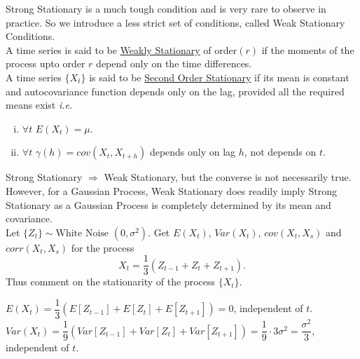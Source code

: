 \documentclass[11pt, a4paper]{article}
\numberwithin{equation}{section}
\theoremstyle{definition}
\begin{document}
Strong Stationary is a much tough condition and is very rare to observe in practice. So we introduce a less strict set of conditions, called Weak Stationary Conditions. \\

A time series is said to be \underline{Weakly Stationary} of order$(r)$ if the moments of the process upto order $r$ depend only on the time differences. \\

A time series $\{X_t\}$ is said to be \underline{Second Order Stationary} if its mean is constant and autocovariance function depends only on the lag, provided all the required means exist \textit{i.e.}

\begin{enumerate}[(i)]
\item $\forall t$ $E(X_t) = \mu$.
\item $\forall t$ $\gamma(h) = cov(X_t, X_{t+h})$ depends only on lag $h$, not depends on $t$.
\end{enumerate}

\bcattention \hspace{0.1cm} Strong Stationary $\Rightarrow$ Weak Stationary, but the converse is not necessarily true. However, for a Gaussian Process, Weak Stationary does readily imply Strong Stationary as a Gaussian Process is completely determined by its mean and covariance. \\

\bcquestion \hspace{0.1cm} Let $\{Z_t\} \sim \text{White Noise }(0, \sigma^2)$. Get $E(X_t)$, $Var(X_t)$, $cov(X_t, X_s)$ and $corr(X_t, X_s)$ for the process $$X_t = \dfrac{1}{3}(Z_{t-1} + Z_t + Z_{t+1}).$$ Thus comment on the stationarity of the process $\{X_t\}$.

\bccrayon \hspace{0.1cm} $E(X_t) = \dfrac{1}{3}(E[Z_{t-1}] + E[Z_t] + E[Z_{t+1}]) = 0$, independent of $t$. \\

$Var(X_t) = \dfrac{1}{9}(Var[Z_{t-1}] + Var[Z_t] + Var[Z_{t+1}]) = \dfrac{1}{9} \cdot 3\sigma^2 = \dfrac{\sigma^2}{3}$, independent of $t$. \\
\end{document}
